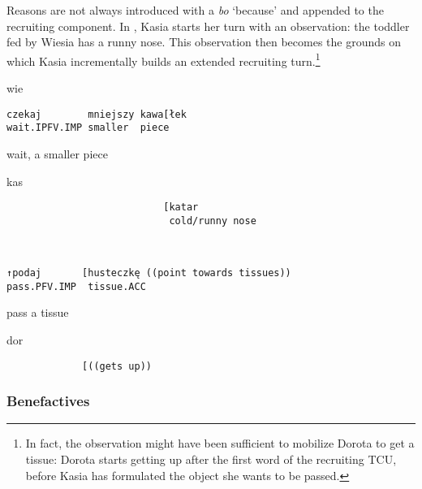\documentclass[output=paper]{langsci/langscibook}
\begin{document}
Reasons are not always introduced with a \textit{bo} `because' and appended to the recruiting component.  In , Kasia starts her turn with an observation: the toddler fed by Wiesia has a runny nose.  This observation then becomes the grounds on which Kasia incrementally builds an extended recruiting turn.\footnote{In fact, the observation might have been sufficient to mobilize Dorota to get a tissue: Dorota starts getting up after the first word of the recruiting TCU, before Kasia has formulated the object she wants to be passed.}

\vspace{2mm}
%
\begin{transbox}{1}{wie}
\begin{verbatim}
czekaj        mniejszy kawa[łek
wait.IPFV.IMP smaller  piece
\end{verbatim}
wait, a smaller piece
\end{transbox}
%
\begin{mdframednoverticalspace}[style=firstfoc]
\begin{transbox}{2}{kas}
\begin{verbatim}
                           [katar
                            cold/runny nose
\end{verbatim}
\end{transbox}
\end{mdframednoverticalspace}
%
\begin{mdframednoverticalspace}[style=firstfoc]
\begin{transbox}{3}{~}
\begin{verbatim}
↑podaj       [husteczkę ((point towards tissues))
pass.PFV.IMP  tissue.ACC
\end{verbatim}
pass a tissue 
\end{transbox}
\end{mdframednoverticalspace}
%
\begin{mdframednoverticalspace}[style=secondfoc]
\begin{transbox}{4}{dor}
\begin{verbatim}
             [((gets up))
\end{verbatim}
\end{transbox}
\end{mdframednoverticalspace}\vspace{-2mm}

\subsubsection{Benefactives}
\end{document}
